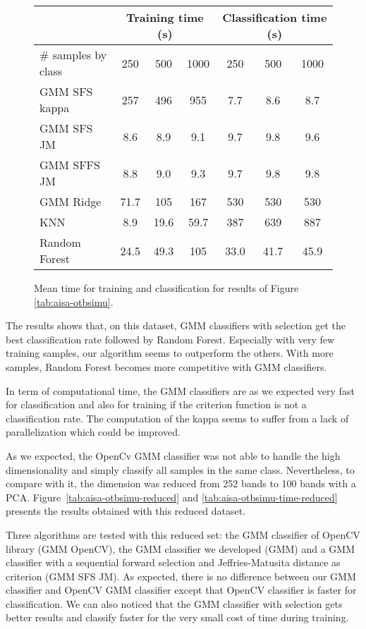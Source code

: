 \documentclass[a4paper,11pt,DIV=16,abstracton]{scrartcl}
\begin{document}
    \begin{figure}[!ht]
        \centering
        \begin{tabular}{|l|c|c|c|c|c|c|}\hline
             & \multicolumn{3}{c|}{\bfseries Training time (s)} & \multicolumn{3}{c|}{\bfseries Classification time (s)} \\ \hline
            \# samples by class & 250 & 500 & 1000 & 250 & 500 & 1000 \\ \hline

            GMM SFS kappa & 257 & 496 & 955 & 7.7 & 8.6 & 8.7 \\
            GMM SFS JM &    8.6 & 8.9 & 9.1 & 9.7 & 9.8 & 9.6 \\
            GMM SFFS JM &   8.8 & 9.0 & 9.3 & 9.7 & 9.8 & 9.8 \\
            GMM Ridge &     71.7 & 105 & 167 & 530 & 530 & 530 \\
            KNN &           8.9 & 19.6 & 59.7 & 387 & 639 & 887 \\
            Random Forest & 24.5 & 49.3 & 105 & 33.0 & 41.7 & 45.9 \\

            \hline
        \end{tabular}
        \caption{Mean time for training and classification for results of Figure \ref{tab:aisa-otbsimu}.\label{tab:aisa-otbsimu-time}}
    \end{figure}

    The results shows that, on this dataset, GMM classifiers with selection get the best classification rate followed by Random Forest. Especially with very few training samples, our algorithm seems to outperform the others. With more samples, Random Forest becomes more competitive with GMM classifiers.

    In term of computational time, the GMM classifiers are as we expected very fast for classification and also for training if the criterion function is not a classification rate. The computation of the kappa seems to suffer from a lack of parallelization which could be improved.

    As we expected, the OpenCv GMM classifier was not able to handle the high dimensionality and simply classify all samples in the same class. Nevertheless, to compare with it, the dimension was reduced from 252 bands to 100 bands with a PCA. Figure~\ref{tab:aisa-otbsimu-reduced} and \ref{tab:aisa-otbsimu-time-reduced} presents the results obtained with this reduced dataset.

    Three algorithms are tested with this reduced set: the GMM classifier of OpenCV library (GMM OpenCV), the GMM classifier we developed (GMM) and a GMM classifier with a sequential forward selection and Jeffries-Matusita distance as criterion (GMM SFS JM). As expected, there is no difference between our GMM classifier and OpenCV GMM classifier except that OpenCV classifier is faster for classification. We can also noticed that the GMM classifier with selection gets better results and classify faster for the very small cost of time during training.
\end{document}
